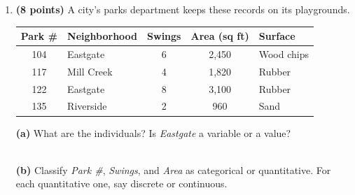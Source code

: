 \documentclass[12pt]{article}
\begin{document}
\vspace{0.06in}

\begin{enumerate}[leftmargin=1.9em, itemsep=0.10in, resume]

  \boxguard[22]
  \item \textbf{(8 points)} A city's parks department keeps these records on its playgrounds.

        \vspace{3pt}
        {\centering\small
        \renewcommand{\arraystretch}{1.05}
        \begin{tabular}{@{} c l c c l @{}}
        \textbf{Park \#} & \textbf{Neighborhood} & \textbf{Swings} & \textbf{Area (sq ft)} &
        \textbf{Surface} \\ \hline
        104 & Eastgate   & 6 & 2,450 & Wood chips \\
        117 & Mill Creek & 4 & 1,820 & Rubber \\
        122 & Eastgate   & 8 & 3,100 & Rubber \\
        135 & Riverside  & 2 & 960   & Sand \\
        \end{tabular}\par}

        \vspace{3pt}
        \textbf{(a)} What are the individuals? Is \emph{Eastgate} a variable or a value?\\[2pt]
        \\

        \boxguard[15]
        \vspace{3pt}
        \textbf{(b)} Classify \emph{Park \#}, \emph{Swings}, and \emph{Area} as categorical or
        quantitative. For each quantitative one, say discrete or continuous.\\[2pt]
        \\
        \\


\end{enumerate}
\end{document}
